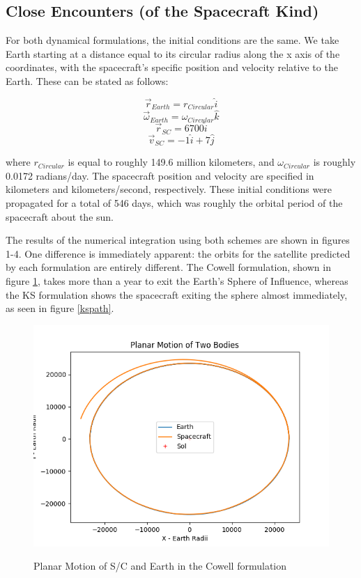 \documentclass[11pt,twoside,letterpaper]{article}
\begin{document}
  \subsection {Close Encounters (of the Spacecraft Kind)}
  For both dynamical formulations, the initial conditions are the
  same. We take Earth starting at a distance equal to its circular
  radius along the x axis of the coordinates, with the spacecraft's
  specific position and velocity relative to the Earth. These can be
  stated as follows:

  \begin{equation} \label{ics}
    \vec{r}_{Earth} = r_{Circular}\hat{i}
  \end{equation}
  \begin{equation}
    \vec{\omega}_{Earth} = \omega_{Circular}\hat{k}
  \end{equation}
  \begin{equation}
    \vec{r}_{SC} = 6700\hat{i}
  \end{equation}
  \begin{equation}
    \vec{v}_{SC} = -1\hat{i} + 7\hat{j}
  \end{equation}

  where \(r_{Circular}\) is equal to roughly 149.6 million kilometers,
  and \(\omega_{Circular}\) is roughly 0.0172 radians/day. The
  spacecraft position and velocity are specified in kilometers and
  kilometers/second, respectively. These initial conditions were
  propagated for a total of 546 days, which was roughly the orbital
  period of the spacecraft about the sun. 

  The results of the numerical integration using both schemes are
  shown in figures 1-4. One difference is immediately apparent: the
  orbits for the satellite predicted by each formulation are entirely
  different. The Cowell formulation, shown in figure \ref{cowPath},
  takes more than a year to exit the Earth's Sphere of Influence,
  whereas the KS formulation shows the spacecraft exiting the sphere
  almost immediately, as seen in figure \ref{kspath}.

  \begin{figure}
    \caption{Planar Motion of S/C and Earth in the Cowell formulation}
    \centering
    \includegraphics[width=\textwidth]{PlanarPath90}
    \label{cowPath}
  \end{figure}
\end{document}
